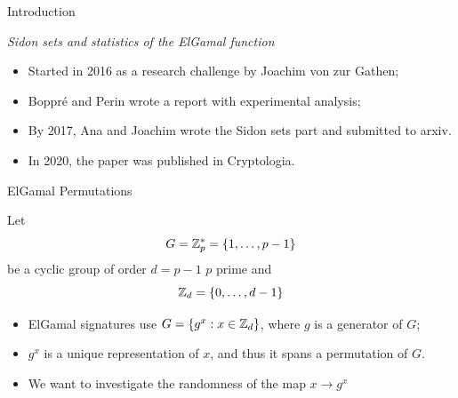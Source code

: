 
\begin{frame}{Introduction}
    \begin{center}
        \emph{Sidon sets and statistics of the ElGamal function} \\
        \citet*{boppre2020sidon}
    \end{center}
    
    \begin{itemize}
        \item Started in 2016 as a research challenge by Joachim von zur Gathen;
        \item Boppré and Perin wrote a report with experimental analysis;
        \item By 2017, Ana and Joachim wrote the Sidon sets part and submitted to arxiv.
        \item In 2020, the paper was published in Cryptologia.
    \end{itemize}
\end{frame}


\begin{frame}{ElGamal Permutations}

\begin{center}
    Let 
    $$G = \mathbb{Z}_p^* = \{1, \ldots, p-1\}$$
    be a cyclic group of order $d =p-1$ $p$ prime and
    $$\mathbb{Z}_d = \{0, \ldots, d-1\}$$
\end{center}

    \pause
    \begin{itemize}
        \item ElGamal signatures use $G = \{ g^x : x\in \mathbb{Z}_d\}$, where $g$ is a generator of $G$;
        \item $g^x$ is a unique representation of $x$, and thus it spans a permutation of $G$.
        \item We want to investigate the randomness of the map $x \to g^x$
    \end{itemize}
    
\end{frame}


